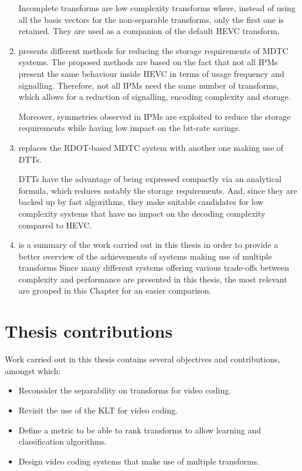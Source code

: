 \documentclass[11pt,a4paper,openright,twoside]{book}
\numberwithin{equation}{section} %
\numberwithin{figure}{section} %
\numberwithin{table}{section} %
\begin{document}
\begin{enumerate}
		Incomplete transforms are low complexity transforms where, instead of
		using all the basis vectors for the non-separable transforms, only the
		first one is retained.
		They are used as a companion of the default \acs{HEVC} transform.
	\item presents different methods for reducing the storage requirements of
		\ac{MDTC} systems.
		The proposed methods are based on the fact that not all \aclp{IPM}
		present the same behaviour inside \ac{HEVC} in terms of usage
		frequency and signalling.
		Therefore, not all \aclp{IPM} need the same number of transforms,
		which allows for a reduction of signalling, encoding complexity and
		storage.

		Moreover, symmetries observed in \aclp{IPM} are exploited to reduce
		the storage requirements while having low impact on the bit-rate
		savings.

	\item replaces the \ac{RDOT}-based \ac{MDTC} system with another one
		making use of \acp{DTT}.

		\acp{DTT} have the advantage of being expressed compactly via an
		analytical formula, which reduces notably the storage
		requirements.
		And, since they are backed up by fast algorithms, they make suitable
		candidates for low complexity systems that have no impact on the
		decoding complexity compared to \acs{HEVC}.

	\item is a summary of the work carried out in this thesis in order to
		provide a better overview of the achievements of systems making use of
		multiple transforms
		Since many different systems offering various trade-offs between
		complexity and performance are presented in this thesis, the most
		relevant are grouped in this Chapter for an easier comparison.
\end{enumerate}

\section*{Thesis contributions}
\label{sec:thesis_contributions}

Work carried out in this thesis contains several objectives and contributions,
amongst which:
\begin{itemize}
	\item Reconsider the separability on transforms for video coding.
	\item Revisit the use of the \acs{KLT} for video coding.
	\item Define a metric to be able to rank transforms to allow learning and
		classification algorithms.
	\item Design video coding systems that make use of multiple transforms.
\end{itemize}
\end{document}
